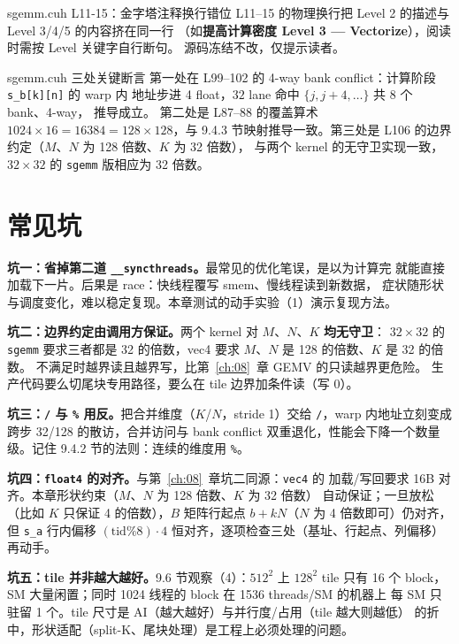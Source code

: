 \begin{kaogu}[F5 排版]{sgemm.cuh L11-15：金字塔注释换行错位}
  L11--15 的物理换行把 Level 2 的描述与 Level 3/4/5 的内容挤在同一行
  （如\textbf{提高计算密度 Level 3 — Vectorize}），阅读时需按 Level 关键字自行断句。
  源码冻结不改，仅提示读者。
\end{kaogu}

\begin{kaogu}[核校通过]{sgemm.cuh 三处关键断言}
  第一处在 L99--102 的 4-way bank conflict：计算阶段 \texttt{s\_b[k][n]} 的 warp 内
  地址步进 4 float，$32$ lane 命中 $\{j, j{+}4, \dots\}$ 共 8 个 bank、4-way，
  推导成立。
  第二处是 L87--88 的覆盖算术 $1024 \times 16 = 16384 = 128 \times 128$，与 9.4.3
  节映射推导一致。第三处是 L106 的边界约定（$M$、$N$ 为 128 倍数、$K$ 为 32 倍数），
  与两个 kernel 的无守卫实现一致，$32{\times}32$ 的 \texttt{sgemm} 版相应为 32 倍数。
\end{kaogu}

\section{常见坑}

\textbf{坑一：省掉第二道 \texttt{\_\allowbreak{}\_\allowbreak{}syncthreads}。}最常见的优化笔误，是以为计算完
就能直接加载下一片。后果是 race：快线程覆写 smem、慢线程读到新数据，
症状随形状与调度变化，难以稳定复现。本章测试的动手实验（1）演示复现方法。

\textbf{坑二：边界约定由调用方保证。}两个 kernel 对 $M$、$N$、$K$ \textbf{均无守卫}：
$32{\times}32$ 的 \texttt{sgemm} 要求三者都是 32 的倍数，vec4 要求 $M$、$N$ 是 128 的倍数、$K$ 是 32 的倍数。
不满足时越界读且越界写，比第~\ref{ch:08}~章 GEMV 的只读越界更危险。
生产代码要么切尾块专用路径，要么在 tile 边界加条件读（写 0）。

\textbf{坑三：\texttt{/} 与 \texttt{\%} 用反。}把合并维度（$K$/$N$，stride 1）交给
\texttt{/}，warp 内地址立刻变成跨步 32/128 的散访，合并访问与 bank conflict
双重退化，性能会下降一个数量级。记住 9.4.2 节的法则：连续的维度用 \texttt{\%}。

\textbf{坑四：\texttt{float4} 的对齐。}与第~\ref{ch:08}~章坑二同源：\texttt{vec4} 的
加载/写回要求 16B 对齐。本章形状约束（$M$、$N$ 为 128 倍数、$K$ 为 32 倍数）
自动保证；一旦放松（比如 $K$ 只保证 4 的倍数），$B$ 矩阵行起点
$b + kN$（$N$ 为 4 倍数即可）仍对齐，但 \texttt{s\_a} 行内偏移 $(\mathrm{tid}\%8)\cdot4$
恒对齐，逐项检查三处（基址、行起点、列偏移）再动手。

\textbf{坑五：tile 并非越大越好。}\allowbreak{}9.6 节观察（4）：$512^2$ 上 $128^2$ tile 只有
16 个 block，SM 大量闲置；同时 1024 线程的 block 在 1536 threads/SM 的机器上
每 SM 只驻留 1 个。tile 尺寸是 AI（越大越好）与并行度/占用（tile 越大则越低）
的折中，形状适配（split-K、尾块处理）是工程上必须处理的问题。

